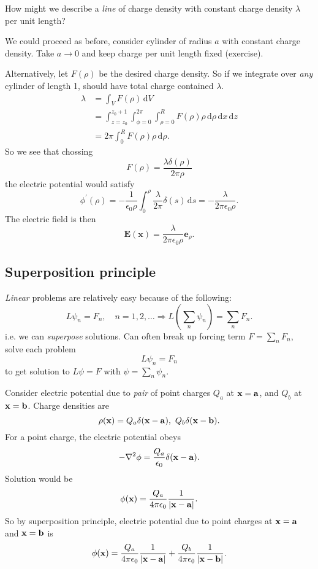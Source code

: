 \begin{example}
    How might we describe a \textit{line} of charge density with constant charge density $ \lambda $ per unit length?

    We could proceed as before, consider cylinder of radius $a$ with constant charge density. Take $a\to 0$ and keep charge per unit length fixed (exercise).

    Alternatively, let $ F(\rho) $ be the desired charge density. So if we integrate over \textit{any} cylinder of length 1, should have total charge contained $ \lambda $.
    \begin{align*}
        \lambda&= \int_{V} F(\rho) \,\mathrm{d}V\\ 
        &= \int_{z=z_0}^{z_0+1} \int_{\phi=0}^{2\pi} \int_{\rho=0}^{R} F(\rho)\rho \,\mathrm{d}\rho \,\mathrm{d}x \,\mathrm{d}z\\ 
        &= 2\pi \int_{0}^{R} F(\rho)\rho \,\mathrm{d}\rho .
    \end{align*}
    So we see that chossing 
    \[
        F(\rho)=\frac{\lambda \delta(\rho)}{2\pi \rho}
    \]
    the electric potential would satisfy
    \[
        \phi^{\prime}(\rho)=-\frac{1}{\epsilon_{0} \rho} \int_{0}^{\rho} \frac{\lambda}{2 \pi} \delta(s) \,\mathrm{d} s=-\frac{\lambda}{2 \pi \epsilon_{0} \rho}.
    \]
    The electric field is then
    \[
        \mathbf{E}(\mathbf{x})=\frac{\lambda}{2 \pi \epsilon_{0} \rho} \mathbf{e}_{\rho}.
    \]
\end{example}

\subsection{Superposition principle}
\textit{Linear} problems are relatively easy because of the following: 
\[
    L \psi_n = F_n,\quad n=1,2,\dots \Longrightarrow 
    L\left( \sum_{n} \psi_n \right) = \sum_{n} F_n.
\]
i.e. we can \textit{superpose} solutions. Can often break up forcing term $ F=\sum_n F_n $, solve each problem 
\[
    L \psi_n=F_n
\]
to get solution to $ L \psi=F $ with $ \psi=\sum_n \psi_n $.

\begin{example}
    Consider electric potential due to \textit{pair} of point charges $ Q_a $ at $ {\bf x}={\bf a} $, and $ Q_b $ at $ {\bf x}={\bf b} $. Charge densities are
    \[
        \rho({\bf x})=Q_a \delta({\bf x}-{\bf a}),\ Q_b \delta({\bf x}-{\bf b}).
    \]
    For a point charge, the electric potential obeys 
    \[
        -\laplacian \phi = \frac{Q_a}{\epsilon_0}\delta(\bfx-\bfa).
    \]
    Solution would be 
    \[
        \phi({\bf x}) = \frac{Q_a}{4\pi \epsilon_0}\frac{1}{|{\bf x}-{\bf a}|}.
    \]
    So by superposition principle, electric potential due to point charges at $ {\bf x}={\bf a} $ and $ {\bf x}={\bf b} $ is 
    \[
        \phi({\bf x})=\frac{Q_a}{4\pi \epsilon_0}\frac{1}{|{\bf x}-{\bf a}|}+\frac{Q_b}{4\pi \epsilon_0}\frac{1}{|{\bf x}-{\bf b}|}.
    \]
\end{example}

